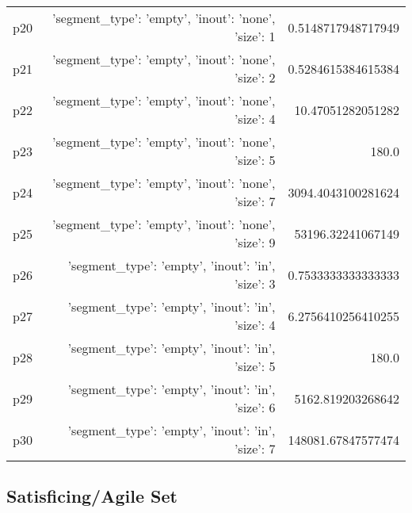 \documentclass{article}
\begin{document}
\begin{center}
\begin{tabular}{r|r|r}
  p20&{'segment\_type': 'empty', 'inout': 'none', 'size': 1}&0.5148717948717949\\
  p21&{'segment\_type': 'empty', 'inout': 'none', 'size': 2}&0.5284615384615384\\
  p22&{'segment\_type': 'empty', 'inout': 'none', 'size': 4}&10.47051282051282\\
  p23&{'segment\_type': 'empty', 'inout': 'none', 'size': 5}&180.0\\
  p24&{'segment\_type': 'empty', 'inout': 'none', 'size': 7}&3094.4043100281624\\
  p25&{'segment\_type': 'empty', 'inout': 'none', 'size': 9}&53196.32241067149\\
  p26&{'segment\_type': 'empty', 'inout': 'in', 'size': 3}&0.7533333333333333\\
  p27&{'segment\_type': 'empty', 'inout': 'in', 'size': 4}&6.2756410256410255\\
  p28&{'segment\_type': 'empty', 'inout': 'in', 'size': 5}&180.0\\
  p29&{'segment\_type': 'empty', 'inout': 'in', 'size': 6}&5162.819203268642\\
  p30&{'segment\_type': 'empty', 'inout': 'in', 'size': 7}&148081.67847577474
                            \end{tabular}
                            \end{center}
                    

                                \subsection*{Satisficing/Agile Set}
                                
\end{document}
